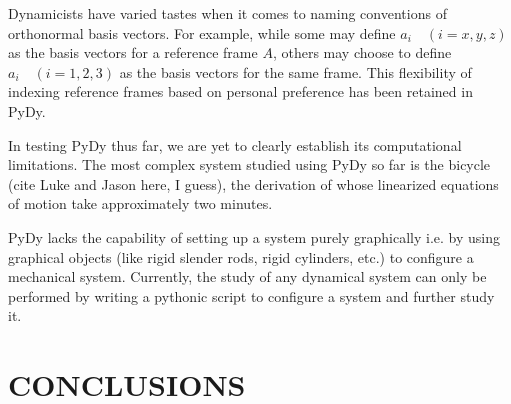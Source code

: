 \documentclass[twocolumn,10pt]{asme2e}
\begin{document}
%
%


Dynamicists have varied tastes when it comes to naming conventions of
orthonormal basis vectors. For example, while some may define $a_i
\quad (i=x,y,z)$ as the basis vectors for a reference frame $A$, others may
choose to define $a_i \quad (i=1,2,3)$ as the basis vectors for the same frame.
This flexibility of indexing reference frames based on personal preference has
been retained in PyDy.

In testing PyDy thus far, we are yet to clearly establish its computational
limitations. The most complex system studied using PyDy so far is the bicycle
(cite Luke and Jason here, I guess), the derivation of whose linearized
equations of motion take approximately two minutes.

PyDy lacks the capability of setting up a system purely graphically i.e. by
using graphical objects (like rigid slender rods, rigid cylinders, etc.) to
configure a mechanical system. Currently, the study of any dynamical system
can only be performed by writing a pythonic script to configure a system and
further study it.


\section*{CONCLUSIONS}



\end{document}
